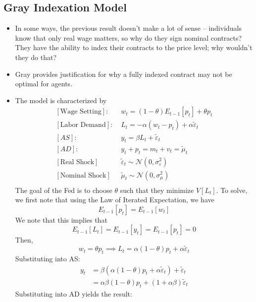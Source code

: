 \documentclass[12pt]{article}
\begin{document}
\subsection{Gray Indexation Model}

\begin{itemize}
    \item In some ways, the previous result doesn't make a lot of sense -- individuals know that only real wage matters, so why do they sign nominal contracts? They have the ability to index their contracts to the price level; why wouldn't they do that?
    \item Gray provides justification for why a fully indexed contract may not be optimal for agents.
    \item The model is characterized by
    \[\begin{split}
        [\text{Wage Setting}]:&\; w_t = (1-\theta)E_{t-1}[p_t] + \theta p_t \\
        [\text{Labor Demand}]:&\; L_t = -\alpha (w_t-p_t) + \alpha \widetilde{\varepsilon}_t \\
        [AS]:&\; y_t = \beta L_t + \widetilde{\varepsilon}_t \\
        [AD]:&\; y_t + p_t = m_t + v_t = \widetilde{\mu}_t \\
        [\text{Real Shock}]&\; \widetilde{\varepsilon}_t \sim \mathcal{N}\left(0, \sigma_{\varepsilon}^2\right) \\
        [\text{Nominal Shock}]&\; \widetilde{\mu}_t \sim \mathcal{N}\left(0, \sigma_{\mu}^2\right) \\
    \end{split}\]
    The goal of the Fed is to choose $\theta$ such that they minimize $V[L_t]$. To solve, we first note that using the Law of Iterated Expectation, we have
    \[E_{t-1}[p_t] = E_{t-1}[w_t]\]
    We note that this implies that
    \[E_{t-1}[L_t] = E_{t-1}[y_t] = E_{t-1}[p_t] = 0\]
    Then, 
    \[w_t = \theta p_t \implies L_t = \alpha(1-\theta)p_t + \alpha \widetilde{\varepsilon}_t\]
    Substituting into AS:
    \[\begin{split}
        y_t &= \beta(\alpha(1-\theta)p_t + \alpha \widetilde{\varepsilon}_t) + \widetilde{\varepsilon}_t \\
        &= \alpha\beta(1-\theta)p_t + (1+\alpha\beta)\widetilde{\varepsilon}_t
    \end{split}\]
    Substituting into AD yields the result:
    \begin{equation}
        \begin{split}

\end{split}
\end{equation}
\end{itemize}
\end{document}
